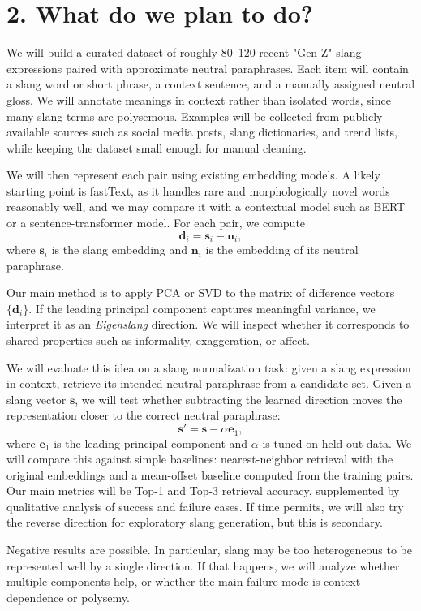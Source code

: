 \documentclass[11pt]{article}
\begin{document}
\section*{2. What do we plan to do?}
\qquad We will build a curated dataset of roughly 80--120 recent "Gen Z" slang expressions paired with approximate neutral paraphrases. Each item will contain a slang word or short phrase, a context sentence, and a manually assigned neutral gloss. We will annotate meanings in context rather than isolated words, since many slang terms are polysemous. Examples will be collected from publicly available sources such as social media posts, slang dictionaries, and trend lists, while keeping the dataset small enough for manual cleaning.

We will then represent each pair using existing embedding models. A likely starting point is fastText, as it handles rare and morphologically novel words reasonably well, and we may compare it with a contextual model such as BERT or a sentence-transformer model. For each pair, we compute
\[
\mathbf{d}_i = \mathbf{s}_i - \mathbf{n}_i,
\]
where $\mathbf{s}_i$ is the slang embedding and $\mathbf{n}_i$ is the embedding of its neutral paraphrase.

Our main method is to apply PCA or SVD to the matrix of difference vectors $\{\mathbf{d}_i\}$. If the leading principal component captures meaningful variance, we interpret it as an \emph{Eigenslang} direction. We will inspect whether it corresponds to shared properties such as informality, exaggeration, or affect.

We will evaluate this idea on a slang normalization task: given a slang expression in context, retrieve its intended neutral paraphrase from a candidate set. Given a slang vector $\mathbf{s}$, we will test whether subtracting the learned direction moves the representation closer to the correct neutral paraphrase:
\[
\mathbf{s}' = \mathbf{s} - \alpha \mathbf{e}_1,
\]
where $\mathbf{e}_1$ is the leading principal component and $\alpha$ is tuned on held-out data. We will compare this against simple baselines: nearest-neighbor retrieval with the original embeddings and a mean-offset baseline computed from the training pairs. Our main metrics will be Top-1 and Top-3 retrieval accuracy, supplemented by qualitative analysis of success and failure cases. If time permits, we will also try the reverse direction for exploratory slang generation, but this is secondary.

Negative results are possible. In particular, slang may be too heterogeneous to be represented well by a single direction. If that happens, we will analyze whether multiple components help, or whether the main failure mode is context dependence or polysemy.
\end{document}
